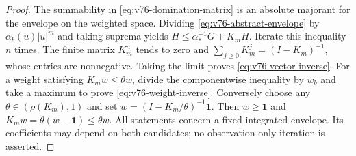 \begin{proof}
The summability in \eqref{eq:v76-domination-matrix} is an absolute
majorant for the envelope on the weighted space.  Dividing
\eqref{eq:v76-abstract-envelope} by $\alpha_b(u)|u|^m$ and taking
suprema yields $H\le\alpha_*^{-1}G+K_mH$.  Iterate this inequality
$n$ times.  The finite matrix $K_m^n$ tends to zero and
$\sum_{j\ge0}K_m^j=(I-K_m)^{-1}$, whose entries are nonnegative.
Taking the limit proves \eqref{eq:v76-vector-inverse}.
For a weight satisfying $K_mw\le\theta w$, divide the componentwise
inequality by $w_b$ and take a maximum to prove
\eqref{eq:v76-weight-inverse}.  Conversely choose any
$\theta\in(\rho(K_m),1)$ and set
$w=(I-K_m/\theta)^{-1}\mathbf1$.
Then $w\ge\mathbf1$ and $K_mw=\theta(w-\mathbf1)\le\theta w$.
All statements concern a fixed integrated envelope.  Its coefficients
may depend on both candidates; no observation-only iteration is asserted.
\end{proof}

